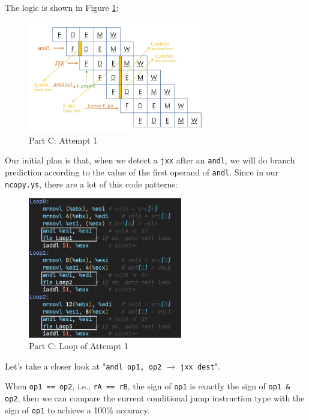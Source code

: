\documentclass[12pt,a4paper]{article}
\begin{document}
The logic is shown in Figure \ref{Fig.partC-attempt1}:
\begin{figure}[H] %
        \centering %
        \includegraphics[width=0.7\textwidth]{partC-attempt1.jpg} %
        \caption{Part C: Attempt 1} %
        \label{Fig.partC-attempt1} %
\end{figure}
Our initial plan is that, when we detect a \texttt{jxx} after an \texttt{andl}, 
we will do branch prediction according to the value of the first operand of \texttt{andl}. 
Since in our \texttt{ncopy.ys}, there are a lot of this code patterns:
\begin{figure}[H] %
        \centering %
        \includegraphics[width=0.6\textwidth]{partC-loop-demo.jpg} %
        \caption{Part C: Loop of Attempt 1} %
        \label{Fig.partC-at1-loop} %
\end{figure}
Let's take a closer look at "\texttt{andl op1, op2} $\rightarrow$ \texttt{jxx dest}".

When \texttt{op1 == op2}, i.e., \texttt{rA == rB}, the sign of \texttt{op1} is exactly the sign of \texttt{op1 \& op2}, then we can compare the current conditional jump instruction type with the sign of \texttt{op1} to achieve a 100\% accuracy. 
\end{document}
